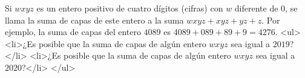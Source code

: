Si $wxyz$ es un entero positivo de cuatro dígitos (cifras) con $w$ diferente de $0$, se llama la suma de capas de este entero a la suma $wxyz+xyz+yz+z$. Por ejemplo, la suma de capas del entero $4089$ es $4089+089+89+9=4276$. 
<ul>
<li>¿Es posible que la suma de capas de algún entero $wxyz$ sea igual a $2019$?</li>
<li>¿Es posible que la suma de capas de algún entero $wxyz$ sea igual a $2020$?</li>
</ul>